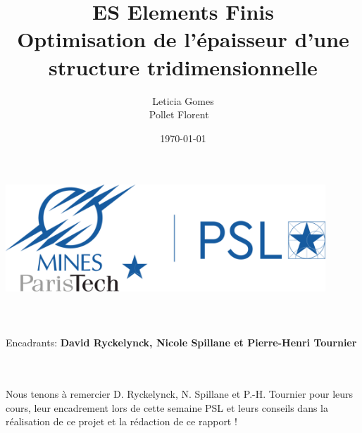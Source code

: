 \title{\Large ES Elements Finis  \\[0.5cm]
        \bf\Large Optimisation de l'épaisseur d'une structure tridimensionnelle}
\author{\large Leticia Gomes\\Pollet Florent \ \\}
\date{\large\today}

\makeatletter
    \begin{titlepage}
        \begin{center}
	   { \includegraphics[width=12cm]{imgs/mp_logo.png}}
	   {\ \\ \ \\}
        \vbox{}\vspace{5cm}
            {\@title }\\[3cm] 
            {\@author}
            {\large \ \\ Encadrants: \bf David Ryckelynck, Nicole Spillane et Pierre-Henri Tournier\\ \ \\}
            {\@date\\}

        \end{center}

    \end{titlepage}

        
    \begin{remerciements}
        Nous tenons à remercier D. Ryckelynck, N. Spillane et P.-H. Tournier pour leurs cours, leur encadrement lors de cette semaine PSL et leurs conseils dans la réalisation
        de ce projet et la rédaction de ce rapport !
    \end{remerciements}


    \tableofcontents


    \clearpage
\makeatother